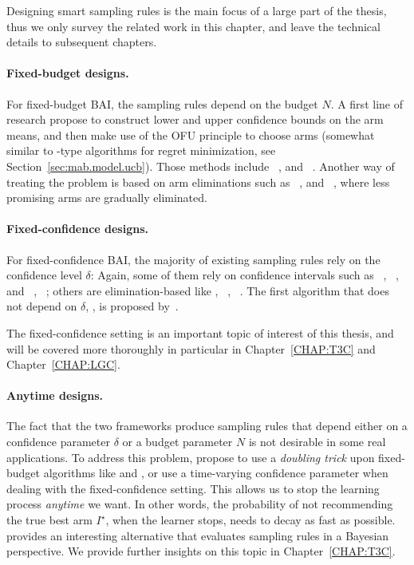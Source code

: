 Designing smart sampling rules is the main focus of a large part of the thesis, thus we only survey the related work in this chapter, and leave the technical details to subsequent chapters.

\paragraph{Fixed-budget designs.}

For fixed-budget BAI, the sampling rules depend on the budget $N$. A first line of research propose to construct lower and upper confidence bounds on the arm means, and then make use of the OFU principle to choose arms (somewhat similar to \UCB-type algorithms for regret minimization, see Section~\ref{sec:mab.model.ucb}). Those methods include \UCBE~\citep{audibert2010budget}, and \UGapE~\citep{gabillon2012ugape}. Another way of treating the problem is based on arm eliminations such as \SR~\citep{audibert2010budget}, and \SHA~\citep{karnin2013sha}, where less promising arms are gradually eliminated.

\paragraph{Fixed-confidence designs.}

For fixed-confidence BAI, the majority of existing sampling rules rely on the confidence level $\delta$: Again, some of them rely on confidence intervals such as \LUCB~\citep{kalyanakrishnan2012lucb}, \UGapE~\citep{gabillon2012ugape}, \KLLUCB and \KLRacing~\citep{kaufmann2013kl}, \LIL~\citep{jamieson2014lilucb}; others are elimination-based like \SE, \ME~\citep{even-dar2003confidence}, \EGE~\citep{karnin2013sha}. The first algorithm that does not depend on $\delta$, \Track, is proposed by~\cite{garivier2016tracknstop}.

The fixed-confidence setting is an important topic of interest of this thesis, and will be covered more thoroughly in particular in Chapter~\ref{CHAP:T3C} and Chapter~\ref{CHAP:LGC}.

\paragraph{Anytime designs.}

The fact that the two frameworks produce sampling rules that depend either on a confidence parameter $\delta$ or a budget parameter $N$ is not desirable in some real applications. To address this problem, \cite{jun2016atlucb} propose to use a \emph{doubling trick} upon fixed-budget algorithms like \SR and \SHA, or use a time-varying confidence parameter when dealing with the fixed-confidence setting. This allows us to stop the learning process \emph{anytime} we want. In other words, the probability of not recommending the true best arm $I^\star$, when the learner stops, needs to decay as fast as possible. \cite{russo2016ttts} provides an interesting alternative that evaluates sampling rules in a Bayesian perspective. We provide further insights on this topic in Chapter~\ref{CHAP:T3C}. %

